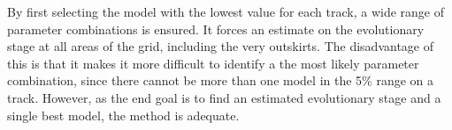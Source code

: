 
 By first selecting the model with the lowest \chis value for each track, a wide range of parameter combinations is ensured. It forces an estimate on the evolutionary stage at all areas of the grid, including the very outskirts. The disadvantage of this is that it makes it more difficult to identify a the most likely parameter combination, since there cannot be more than one model in the 5\% range on a track. However, as the end goal is to find an estimated evolutionary stage and a single best model, the method is adequate.




